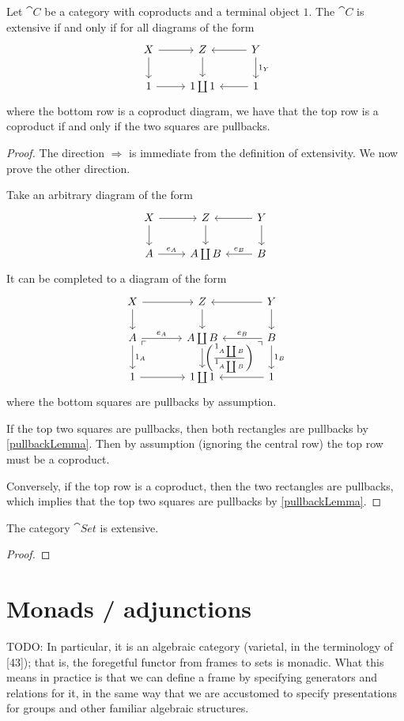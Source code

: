 \begin{proposition}
Let $\cat{C}$ be a category with coproducts and a terminal object $1$. The $\cat{C}$ is extensive \textup{if and only if} for all diagrams of the form
\[ \begin{tikzcd}
X \ar[r] \ar[d] & Z \ar[d] & Y \ar[l] \ar[d, "1_Y"] \\
1 \ar[r] & 1 \coprod 1 & \ar[l] 1
\end{tikzcd} \]
where the bottom row is a coproduct diagram, we have that the top row is a coproduct if and only if the two squares are pullbacks.
\end{proposition}
\begin{proof}
The direction $\Rightarrow$ is immediate from the definition of extensivity. We now prove the other direction.

Take an arbitrary diagram of the form
\[ \begin{tikzcd}
X \ar[r] \ar[d] & Z \ar[d] & Y \ar[l] \ar[d] \\
A \ar[r, "e_A"] & A \coprod B & \ar[l, swap, "e_B"] B
\end{tikzcd} \]
It can be completed to a diagram of the form
\[ \begin{tikzcd}[column sep=large]
X \ar[r] \ar[d] & Z \ar[d] & Y \ar[l] \ar[d] \\
A \ar[r, "e_A"] \ar[d, "1_A"] \pbCorner & A \coprod B \ar[d, "{\coprodParallel{1_{A\coprod B}}{1_{A\coprod B}}}"] & \ar[l, swap, "e_B"] B \ar[d, "1_B"] \pbflipCorner \\
1 \ar[r] & 1 \coprod 1 & \ar[l] 1
\end{tikzcd} \]
where the bottom squares are pullbacks by assumption.

If the top two squares are pullbacks, then both rectangles are pullbacks by \ref{pullbackLemma}. Then by assumption (ignoring the central row) the top row must be a coproduct.

Conversely, if the top row is a coproduct, then the two rectangles are pullbacks, which implies that the top two squares are pullbacks by \ref{pullbackLemma}.
\end{proof}
\begin{corollary}
The category $\cat{Set}$ is extensive.
\end{corollary}
\begin{proof}

\end{proof}

\chapter{Monads / adjunctions}
TODO:   In particular, it is an algebraic category (varietal, in the terminology of [43]); that
is, the foregetful functor from frames to sets is monadic. What this means in
practice is that we can define a frame by specifying generators and relations
for it, in the same way that we are accustomed to specify presentations for
groups and other familiar algebraic structures.